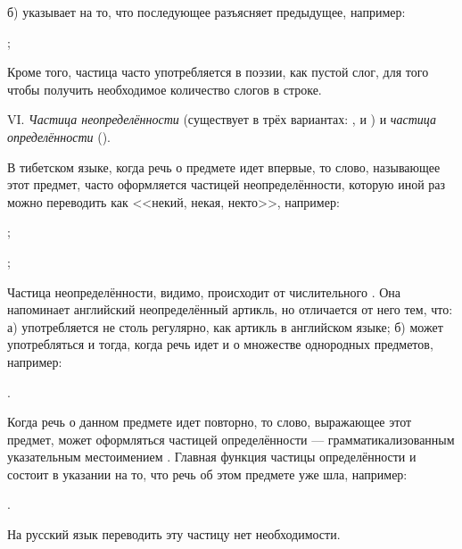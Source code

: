 б) указывает на то, что последующее разъясняет предыдущее, например:
\begin{prfsample}
	\item {};
\end{prfsample}

Кроме того, частица  часто употребляется в поэзии, как пустой слог, для того чтобы получить необходимое количество слогов в строке.

VI. \emph{Частица неопределённости} (существует в трёх вариантах: ,  и ) и \emph{частица определённости} ().

В тибетском языке, когда речь о предмете идет впервые, то слово, называющее этот предмет, часто оформляется частицей неопределённости, которую иной раз можно переводить как <<некий, некая, некто>>, например:
\begin{prfsample}
	\item {};
	\item {};
\end{prfsample}

Частица неопределённости, видимо, происходит от числительного . Она напоминает английский неопределённый артикль, но отличается от него тем, что: а) употребляется не столь регулярно, как артикль в английском языке; б) может употребляться и тогда, когда речь идет и о множестве однородных предметов, например:
\begin{prfsample}
	\item {}.
\end{prfsample}

Когда речь о данном предмете идет повторно, то слово, выражающее этот предмет, может оформляться частицей определённости  --- грамматикализованным указательным местоимением . Главная функция частицы определённости и состоит в указании на то, что речь об этом предмете уже шла, например:
\begin{prfsample}
	\item {}.
\end{prfsample}
На русский язык переводить эту частицу нет необходимости.

